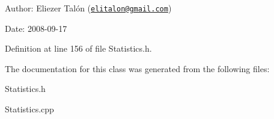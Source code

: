 \begin{Desc}
\item[Author:]Eliezer Talón (\href{mailto:elitalon@gmail.com}{\tt elitalon@gmail.com}) \end{Desc}
\begin{Desc}
\item[Date:]2008-09-17 \end{Desc}


Definition at line 156 of file Statistics.h.

The documentation for this class was generated from the following files:\begin{CompactItemize}
\item 
Statistics.h\item 
Statistics.cpp\end{CompactItemize}

